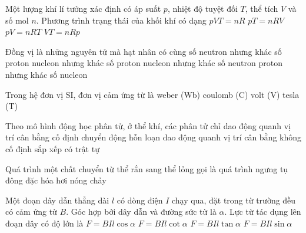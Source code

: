 	\begin{ex}%
		Một lượng khí lí tưởng xác định có áp suất $p$, nhiệt độ tuyệt đối $T$, thể tích $V$ và số mol $n$. Phương trình trạng thái của khối khí có dạng
		\choice
		{$pVT=nR$}
		{$pT=nRV$}
		{\True $pV=nRT$}
		{$VT=nRp$}
	\end{ex}

	\begin{ex}%
		Đồng vị là những nguyên tử mà hạt nhân có cùng số
		\choice
		{neutron nhưng khác số proton}
		{nucleon nhưng khác số proton}
		{nucleon nhưng khác số neutron}
		{\True proton nhưng khác số nucleon}
	\end{ex}

	\begin{ex}%
		Trong hệ đơn vị SI, đơn vị cảm ứng từ là
		\choice
		{weber (Wb)}
		{coulomb (C)}
		{volt (V)}
		{\True tesla (T)}
	\end{ex}

	\begin{ex}%
		Theo mô hình động học phân tử, ở thể khí, các phân tử
		\choice
		{chỉ dao động quanh vị trí cân bằng cố định}
		{\True chuyển động hỗn loạn}
		{dao động quanh vị trí cân bằng không cố định}
		{sắp xếp có trật tự}
	\end{ex}

	\begin{ex}%
		Quá trình một chất chuyển từ thể rắn sang thể lỏng gọi là quá trình
		\choice
		{ngưng tụ}
		{đông đặc}
		{hóa hơi}
		{\True nóng chảy}
	\end{ex}

	\begin{ex}%
		Một đoạn dây dẫn thẳng dài $l$ có dòng điện $I$ chạy qua, đặt trong từ trường đều có cảm ứng từ $B$. Góc hợp bởi dây dẫn và đường sức từ là $\alpha$. Lực từ tác dụng lên đoạn dây có độ lớn là
		\choice
		{$F=BIl\cos\alpha$}
		{$F=BIl\cot\alpha$}
		{$F=BIl\tan\alpha$}
		{\True $F=BIl\sin\alpha$}
	\end{ex}

